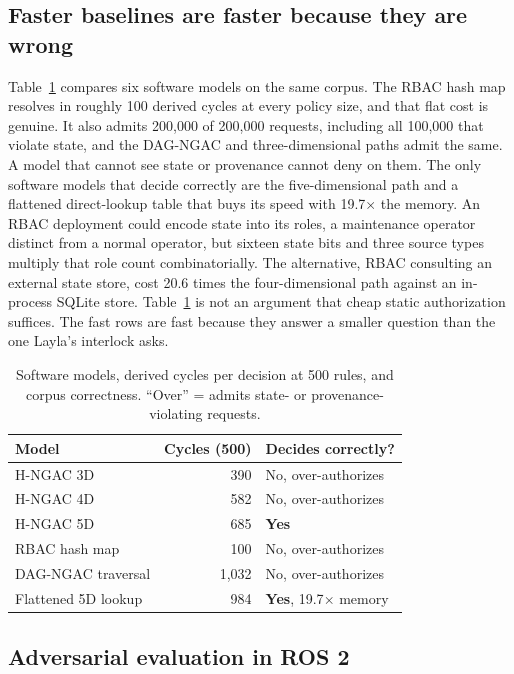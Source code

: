 \documentclass[conference]{IEEEtran}
\begin{document}
\subsection{Faster baselines are faster because they are wrong}

Table~\ref{tab:models} compares six software models on the same corpus. The RBAC hash map resolves in roughly 100 derived cycles at every policy size, and that flat cost is genuine. It also admits 200{,}000 of 200{,}000 requests, including all 100{,}000 that violate state, and the DAG-NGAC and three-dimensional paths admit the same. A model that cannot see state or provenance cannot deny on them. The only software models that decide correctly are the five-dimensional path and a flattened direct-lookup table that buys its speed with 19.7$\times$ the memory. An RBAC deployment could encode state into its roles, a maintenance operator distinct from a normal operator, but sixteen state bits and three source types multiply that role count combinatorially. The alternative, RBAC consulting an external state store, cost 20.6 times the four-dimensional path against an in-process SQLite store. Table~\ref{tab:models} is not an argument that cheap static authorization suffices. The fast rows are fast because they answer a smaller question than the one Layla's interlock asks.

\begin{table}[t]
\caption{Software models, derived cycles per decision at 500 rules, and corpus correctness. ``Over'' = admits state- or provenance-violating requests.}
\label{tab:models}
\centering
\begin{tabular}{lrl}
\toprule
Model & Cycles (500) & Decides correctly? \\
\midrule
H-NGAC 3D & 390 & No, over-authorizes \\
H-NGAC 4D & 582 & No, over-authorizes \\
H-NGAC 5D & 685 & \textbf{Yes} \\
RBAC hash map & 100 & No, over-authorizes \\
DAG-NGAC traversal & 1{,}032 & No, over-authorizes \\
Flattened 5D lookup & 984 & \textbf{Yes}, 19.7$\times$ memory \\
\bottomrule
\end{tabular}
\end{table}

\subsection{Adversarial evaluation in ROS 2}
\end{document}
